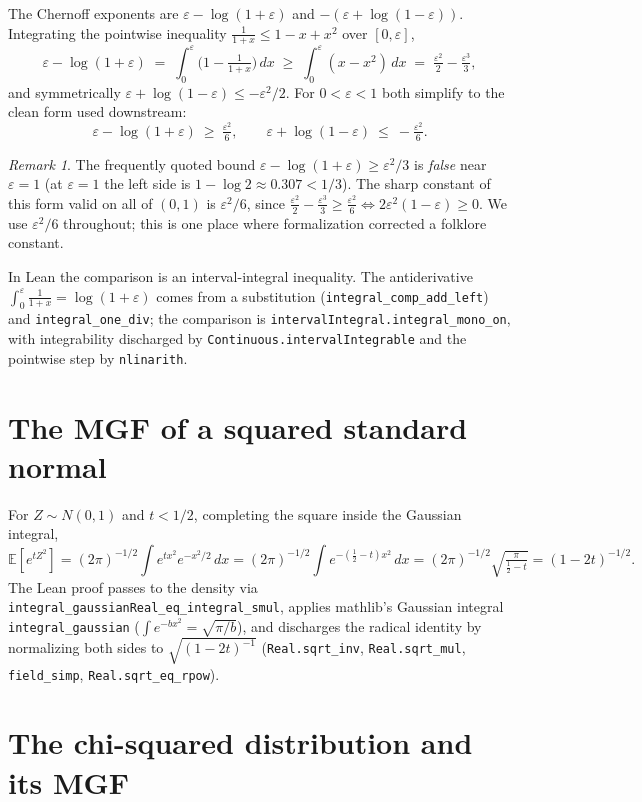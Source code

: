 \documentclass[11pt]{article}
\theoremstyle{remark}
\newtheorem*{remark}{Remark}
\newcommand{\E}{\mathbb{E}}
\newcommand{\eps}{\varepsilon}
\begin{document}
The Chernoff exponents are $\eps-\log(1+\eps)$ and $-(\eps+\log(1-\eps))$. Integrating the
pointwise inequality $\tfrac1{1+x}\le 1-x+x^2$ over $[0,\eps]$,
\[
  \eps-\log(1+\eps) \;=\; \int_0^\eps\!\Big(1-\tfrac1{1+x}\Big)\,dx
  \;\ge\; \int_0^\eps (x-x^2)\,dx \;=\; \tfrac{\eps^2}2-\tfrac{\eps^3}3,
\]
and symmetrically $\eps+\log(1-\eps)\le-\eps^2/2$. For $0<\eps<1$ both simplify to the
clean form used downstream:
\[
  \eps-\log(1+\eps)\ \ge\ \tfrac{\eps^2}{6},\qquad
  \eps+\log(1-\eps)\ \le\ -\tfrac{\eps^2}{6}.
\]

\begin{remark}
The frequently quoted bound $\eps-\log(1+\eps)\ge\eps^2/3$ is \emph{false} near $\eps=1$
(at $\eps=1$ the left side is $1-\log2\approx0.307<1/3$). The sharp constant of this form
valid on all of $(0,1)$ is $\eps^2/6$, since
$\tfrac{\eps^2}2-\tfrac{\eps^3}3\ge\tfrac{\eps^2}6\iff 2\eps^2(1-\eps)\ge0$. We use
$\eps^2/6$ throughout; this is one place where formalization corrected a folklore
constant.
\end{remark}

In Lean the comparison is an interval-integral inequality. The antiderivative
$\int_0^\eps\tfrac1{1+x}=\log(1+\eps)$ comes from a substitution
(\texttt{integral\_comp\_add\_left}) and \texttt{integral\_one\_div}; the comparison is
\texttt{intervalIntegral.integral\_mono\_on}, with integrability discharged by
\texttt{Continuous.intervalIntegrable} and the pointwise step by \texttt{nlinarith}.

\section{The MGF of a squared standard normal}\label{sec:gmgf}

For $Z\sim N(0,1)$ and $t<1/2$, completing the square inside the Gaussian integral,
\[
  \E[e^{tZ^2}] = (2\pi)^{-1/2}\!\int e^{tx^2}e^{-x^2/2}\,dx
  = (2\pi)^{-1/2}\!\int e^{-(\frac12-t)x^2}\,dx
  = (2\pi)^{-1/2}\sqrt{\tfrac{\pi}{\frac12-t}} = (1-2t)^{-1/2}.
\]
The Lean proof passes to the density via \texttt{integral\_gaussianReal\_eq\_integral\_smul},
applies mathlib's Gaussian integral \texttt{integral\_gaussian}
($\int e^{-bx^2}=\sqrt{\pi/b}$), and discharges the radical identity by normalizing both
sides to $\sqrt{(1-2t)^{-1}}$ (\texttt{Real.sqrt\_inv}, \texttt{Real.sqrt\_mul},
\texttt{field\_simp}, \texttt{Real.sqrt\_eq\_rpow}).

\section{The chi-squared distribution and its MGF}\label{sec:chisq}
\end{document}

